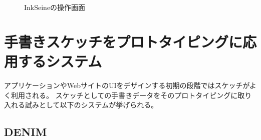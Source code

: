 \begin{figure}[H]
    \centering
    \caption{InkSeineの操作画面}
    \label{inkseine}
\end{figure}

\section{手書きスケッチをプロトタイピングに応用するシステム}
アプリケーションやWebサイトのUIをデザインする初期の段階ではスケッチがよく利用される\cite{Newman2000SitemapsSA}。
スケッチとしての手書きデータをそのプロトタイピングに取り入れる試みとして以下のシステムが挙げられる。

\subsection{DENIM}
\label{denim}

